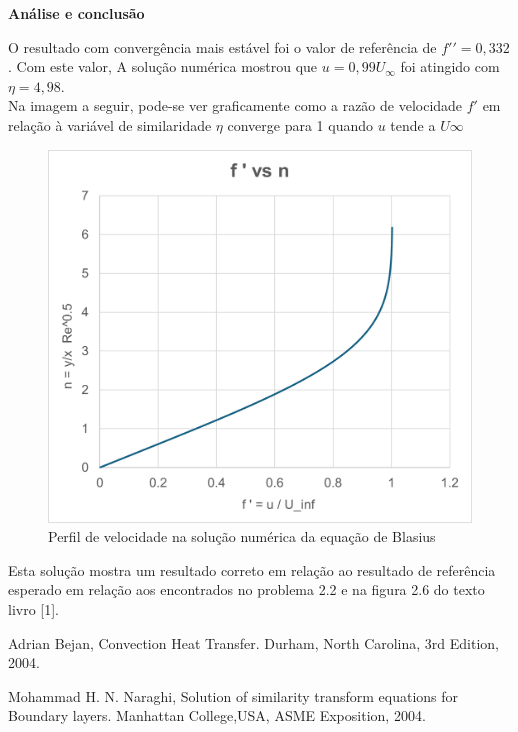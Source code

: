 \documentclass[12pt]{article}
\begin{document}
 
 \textbf{Análise e conclusão}
 
 O resultado com convergência mais estável foi o valor de referência de $f\prime\prime =0,332$. Com este valor, A solução numérica mostrou que $u=0,99U_{\infty}$ foi atingido com $\eta = 4,98$.\\
 
 Na imagem a seguir, pode-se ver graficamente como a razão de velocidade $f\prime$ em relação à variável de similaridade $\eta$ converge para 1 quando $u$ tende a $U\infty$
 


\begin{figure}[H]
	\centering
	\includegraphics[width=.65\textwidth]{Figures/1_3}
	\caption{Perfil de velocidade na solução numérica da equação de Blasius}
\end{figure}

 Esta solução mostra um resultado correto em relação ao resultado de referência esperado em relação aos encontrados no problema 2.2 e na figura 2.6 do texto livro [1].

\begin{thebibliography}{999}
	
	Adrian Bejan,
	Convection Heat Transfer.
	Durham, North Carolina,
	3rd Edition,
	2004.
	
	Mohammad H. N. Naraghi,
	Solution of similarity transform equations for Boundary layers.
	Manhattan College,USA,
	ASME Exposition,
	2004.
	
\end{thebibliography}
\end{document}

